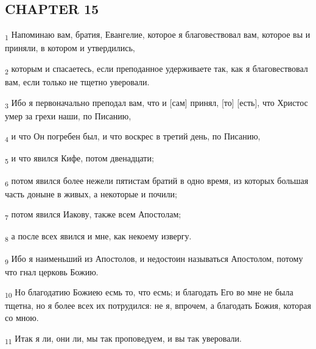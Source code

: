 \subsection{CHAPTER 15}
\begin{tcolorbox}
\textsubscript{1} Напоминаю вам, братия, Евангелие, которое я благовествовал вам, которое вы и приняли, в котором и утвердились,
\end{tcolorbox}
\begin{tcolorbox}
\textsubscript{2} которым и спасаетесь, если преподанное удерживаете так, как я благовествовал вам, если только не тщетно уверовали.
\end{tcolorbox}
\begin{tcolorbox}
\textsubscript{3} Ибо я первоначально преподал вам, что и [сам] принял, [то] [есть], что Христос умер за грехи наши, по Писанию,
\end{tcolorbox}
\begin{tcolorbox}
\textsubscript{4} и что Он погребен был, и что воскрес в третий день, по Писанию,
\end{tcolorbox}
\begin{tcolorbox}
\textsubscript{5} и что явился Кифе, потом двенадцати;
\end{tcolorbox}
\begin{tcolorbox}
\textsubscript{6} потом явился более нежели пятистам братий в одно время, из которых большая часть доныне в живых, а некоторые и почили;
\end{tcolorbox}
\begin{tcolorbox}
\textsubscript{7} потом явился Иакову, также всем Апостолам;
\end{tcolorbox}
\begin{tcolorbox}
\textsubscript{8} а после всех явился и мне, как некоему извергу.
\end{tcolorbox}
\begin{tcolorbox}
\textsubscript{9} Ибо я наименьший из Апостолов, и недостоин называться Апостолом, потому что гнал церковь Божию.
\end{tcolorbox}
\begin{tcolorbox}
\textsubscript{10} Но благодатию Божиею есмь то, что есмь; и благодать Его во мне не была тщетна, но я более всех их потрудился: не я, впрочем, а благодать Божия, которая со мною.
\end{tcolorbox}
\begin{tcolorbox}
\textsubscript{11} Итак я ли, они ли, мы так проповедуем, и вы так уверовали.
\end{tcolorbox}
